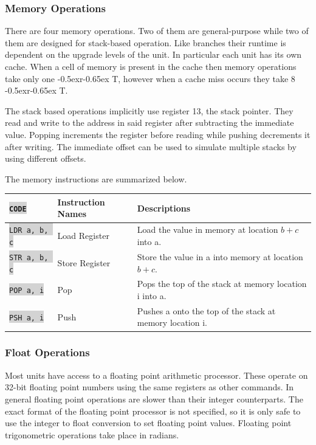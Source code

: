 \documentclass{article}
\newcommand{\vnscode}[1]{\colorbox{lightgray}{\lstinline[language=vns]{#1}}}
\newcommand{\RT}{\lower-0.5ex\hbox{r}\kern-0.65ex T}
\begin{document}
\subsubsection{Memory Operations}

There are four memory operations. Two of them are general-purpose while two of
them are designed for stack-based operation. Like branches their runtime is
dependent on the upgrade levels of the unit. In particular each unit has its own
cache. When a cell of memory is present in the cache then memory operations take
only one \RT, however when a cache miss occurs they take 8 \RT.

The stack based operations implicitly use register 13, the stack pointer. They
read and write to the address in said register after subtracting the immediate
value. Popping increments the register before reading while pushing decrements
it after writing. The immediate offset can be used to simulate multiple stacks
by using different offsets.

The memory instructions are summarized below.

\begin{minipage}{\textwidth}
\label{table:memory}
\centering
\begin{tabular}{lll}
    \hline \vnscode{CODE} & Instruction Names & Descriptions \\ \hline
    \vnscode{LDR a, b, c} & Load Register & Load the value in memory at location $b+c$ into a. \\
    \vnscode{STR a, b, c} & Store Register & Store the value in a into memory at location $b+c$. \\
    \vnscode{POP a, i} & Pop & Pops the top of the stack at memory location i into a. \\
    \vnscode{PSH a, i} & Push & Pushes a onto the top of the stack at memory location i. \\
\end{tabular}
\end{minipage}

\subsubsection{Float Operations}

Most units have access to a floating point arithmetic processor. These operate
on 32-bit floating point numbers using the same registers as other commands. In
general floating point operations are slower than their integer counterparts.
The exact format of the floating point processor is not specified, so it is only
safe to use the integer to float conversion to set floating point values.
Floating point trigonometric operations take place in radians.
\end{document}

